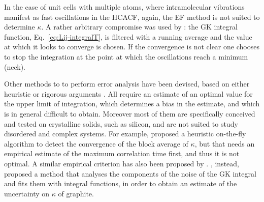 \begin{LEtext}
In the case of unit cells with multiple atoms, where intramolecular vibrations manifest as fast oscillations in the HCACF, again, the EF method is not suited to determine $\kappa$. A rather arbitrary compromise was used by \citet{McGaughey2004b}: the GK integral function, Eq.~\eqref{eq:Lij-integralT}, is filtered with a running average \cite{MovingAverage} and the value at which it looks to converge is chosen. If the convergence is not clear one chooses to stop the integration at the point at which the oscillations reach a minimum (neck). 

Other methods to to perform error analysis have been devised, based on either heuristic or rigorous arguments \cite{Howell2012,Chen2010,Jones2012,Wang_gk2017,Oliveira2017}. All require an estimate of an optimal value for the upper limit of integration, which determines a bias in the estimate, and which is in general difficult to obtain. Moreover most of them are specifically conceived and tested on crystalline solids, such as silicon, and are not suited to study disordered and complex systems. 
For example, \citet{Jones2012} proposed a heuristic on-the-fly algorithm to detect the convergence of the block average of $\kappa$, but that needs an empirical estimate of the maximum correlation time first, and thus it is not optimal. A similar empirical criterion has also been proposed by \citet{Wang_gk2017}. \citet{Oliveira2017}, instead, proposed a method that analyses the components of the noise of the GK integral and fits them with integral functions, in order to obtain an estimate of the uncertainty on $\kappa$ of graphite.



\end{LEtext}
